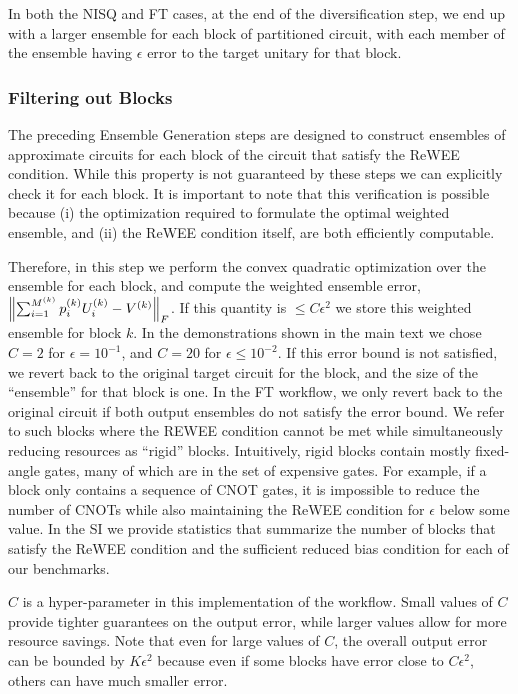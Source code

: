 In both the NISQ and FT cases, at the end of the diversification step, we end up with a larger ensemble for each block of partitioned circuit, with each member of the ensemble having $\epsilon$ error to the target unitary for that block.

\subsubsection*{Filtering out Blocks}
\label{sec:bias_filter}
The preceding Ensemble Generation steps are designed to construct ensembles of approximate circuits for each block of the circuit that satisfy the ReWEE condition. While this property is not guaranteed by these steps we can explicitly check it for each block. It is important to note that this verification is possible because (i) the optimization required to formulate the optimal weighted ensemble, and (ii) the ReWEE condition itself, are both efficiently computable. 

Therefore, in this step we perform the convex quadratic optimization over the ensemble for each block, and compute the weighted ensemble error, $\left\lVert \sum_{i=1}^{M^{(k)}}p^{(k)}_i U^{(k)}_i - V^{(k)} \right\rVert_F$. If this quantity is $\leq C\epsilon^2$ we store this weighted ensemble for block $k$. In the demonstrations shown in the main text we chose $C=2$ for $\epsilon=10^{-1}$, and $C=20$ for $\epsilon \leq 10^{-2}$. If this error bound is not satisfied, we revert back to the original target circuit for the block, and the size of the ``ensemble'' for that block is one. In the FT workflow, we only revert back to the original circuit if both output ensembles do not satisfy the error bound. We refer to such blocks where the REWEE condition cannot be met while simultaneously reducing resources as ``rigid'' blocks. Intuitively, rigid blocks contain mostly fixed-angle gates, many of which are in the set of expensive gates. For example, if a block only contains a sequence of CNOT gates, it is impossible to reduce the number of CNOTs while also maintaining the ReWEE condition for $\epsilon$ below some value. In the SI we provide statistics that summarize the number of blocks that satisfy the ReWEE condition and the sufficient reduced bias condition for each of our benchmarks. 

$C$ is a hyper-parameter in this implementation of the workflow. Small values of $C$ provide tighter guarantees on the output error, while larger values allow for more resource savings. Note that even for large values of $C$, the overall output error can be bounded by $K\epsilon^2$ because even if some blocks have error close to $C\epsilon^2$, others can have much smaller error.

